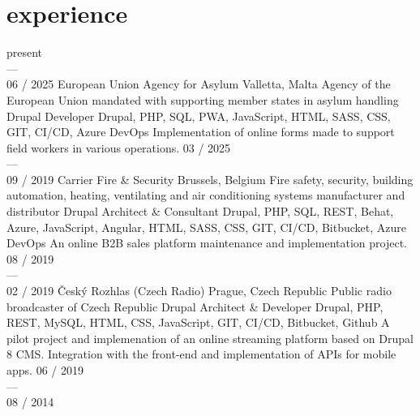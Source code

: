 \documentclass[]{friggeri-cv} %
\begin{document}

\bigskip

\section{experience}
\begin{entrylist}
  \job
  {present \\ --- \\ 06 / 2025}
  {European Union Agency for Asylum}
  {Valletta, Malta}
  {Agency of the European Union mandated with supporting member states in asylum handling}
  {
    \position
      {Drupal Developer}
      {Drupal, PHP, SQL, PWA, JavaScript, HTML, SASS, CSS, GIT, CI/CD, Azure DevOps}
      {
        Implementation of online forms made to support field workers in various operations.
      }
  }
  \job
  {03 / 2025 \\ --- \\ 09 / 2019}
  {Carrier Fire \& Security}
  {Brussels, Belgium}
  {Fire safety, security, building automation, heating, ventilating and air conditioning systems manufacturer and distributor}
  {
    \position
      {Drupal Architect \& Consultant}
      {Drupal, PHP, SQL, REST, Behat, Azure, JavaScript, Angular, HTML, SASS, CSS, GIT, CI/CD, Bitbucket, Azure DevOps}
      {
        An online B2B sales platform maintenance and implementation project.
      }
  }
  \job
  {08 / 2019 \\ --- \\ 02 / 2019}
  {Český Rozhlas (Czech Radio)}
  {Prague, Czech Republic}
  {Public radio broadcaster of Czech Republic}
  {
    \position
      {Drupal Architect \& Developer}
      {Drupal, PHP, REST, MySQL, HTML, CSS, JavaScript, GIT, CI/CD, Bitbucket, Github}
      {
        A pilot project and implemenation of an online streaming platform based on Drupal 8 CMS. Integration
        with the front-end and implementation of APIs for mobile apps.
      }
  }
  \job
  {06 / 2019 \\ --- \\ 08 / 2014}

\end{entrylist}
\end{document}
